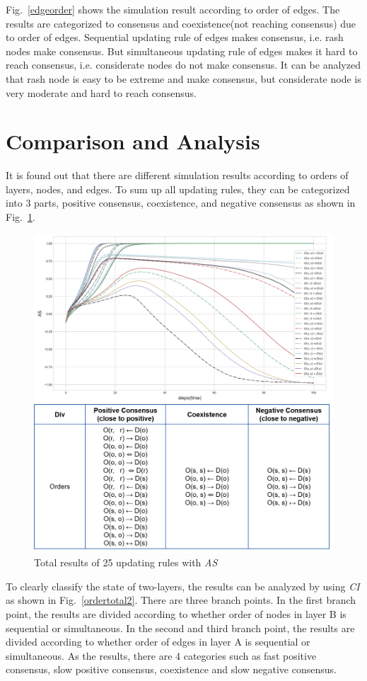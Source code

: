 Fig.~\ref{edgeorder} shows the simulation result according to order of edges. The results are categorized to consensus and coexistence(not reaching consensus) due to order of edges. Sequential updating rule of edges makes consensus, i.e. rash nodes make consensus. But simultaneous updating rule of edges makes it hard to reach consensus, i.e. considerate nodes do not make consensus. It can be analyzed that rash node is easy to be extreme and make consensus, but considerate node is very moderate and hard to reach consensus.
 
\section{Comparison and Analysis}
It is found out that there are different simulation results according to orders of layers, nodes, and edges. To sum up all updating rules, they can be categorized into 3 parts, positive consensus, coexistence, and negative consensus as shown in Fig.~\ref{ordertotal}.  
\begin{figure}[!htb]
	\centering
	\includegraphics[width=\hsize]{figure/chap4_ordertotal.png}
	\caption{Total results of 25 updating rules with \textit{AS}}
	\label{ordertotal}
\end{figure}
To clearly classify the state of two-layers, the results can be analyzed by using \textit{CI} as shown in Fig.~\ref{ordertotal2}. There are three branch points. In the first branch point, the results are divided according to whether order of nodes in layer B is sequential or simultaneous. In the second and third branch point, the results are divided according to whether order of edges in layer A is sequential or simultaneous. As the results, there are 4 categories such as fast positive consensus, slow positive consensus, coexistence and slow negative consensus. 
